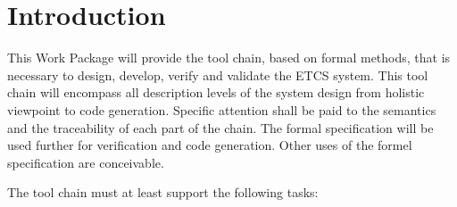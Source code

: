 \documentclass{template/openetcs_article}
\begin{document}







\setlength{\marginparwidth}{1in}
\let\oldmarginpar\marginpar
\renewcommand\marginpar[1]{\-\oldmarginpar[\raggedleft\scriptsize #1]%
{\raggedright\scriptsize #1}}

\newcommand{\oldtext}[1]{{Old: \scriptsize #1}}

\newenvironment{inoutput}
{\vspace{2mm}
\noindent
\begin{tabular}{|r|p{.68\linewidth}|l|}
\hline}
{
\hline
\end{tabular}}

\section*{Introduction}

This Work Package will provide the tool chain, based on formal methods, that is necessary to
design, develop, verify and validate the ETCS system. This tool chain will encompass all description levels of the system design from holistic viewpoint to code generation. Specific attention shall be paid to the semantics and the traceability of each part of the chain. The formal specification will be used further for verification and code generation.  Other uses of the formel specification are conceivable.

The tool chain must at least support the following tasks:
\end{document}
